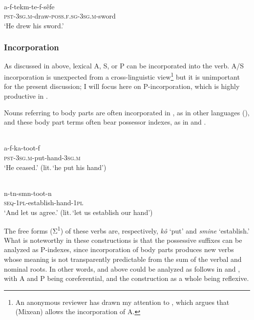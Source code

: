 \documentclass[output=paper]{LSP/langsci}
\begin{document}
\begin{exe}\ex%
\label{05-gr-ex:23}
\\
\gll a-f-tekm-te-f-sêfe\\
\textsc{pst-3sg.m}-draw-\textsc{poss.f.sg-3sg.m}-sword\\
\glt ‘He drew his sword.’ %
\end{exe}

\subsubsection{Incorporation}
\label{05-sec:3-2-3}

As discussed in  above, lexical A, S, or P can be incorporated into the verb. A/S incorporation is unexpected from a cross-linguistic view\footnote{An anonymous reviewer has drawn my attention to \citet{Zavala2000Inversion}, which argues that  (Mixean) allows the incorporation of A.} but it is unimportant for the present discussion; I will focus here on P-incorporation, which is highly productive in . 

 Nouns referring to body parts are often incorporated in , as in other languages (\citealt{Mithun1984Evolution,Mithun1986Nature,Mithunetal1999Effect}), and these body part terms often bear possessor indexes, as in  and .

\begin{exe}
\ex%
\label{05-gr-ex:24}
\\
\gll a-f-ka-toot-f\\
\textsc{pst-3sg.m}-put-hand-\textsc{3sg.m}\\
\glt ‘He ceased.' (lit.\,‘he put his hand’) 
\end{exe}

\begin{exe}
\ex%
\label{05-gr-ex:25}
\\
\gll n-tn-smn-toot-n\\
\textsc{seq-1pl}-establish-hand-\textsc{1pl}\\
\glt ‘And let us agree.’ (lit.\,‘let us establish our hand’) %
\end{exe}

The free forms (Σ\textsuperscript{1}) of these verbs are, respectively, \textit{kô} ‘put’ and \textit{smine} ‘establish.’ What is noteworthy in these constructions is that the possessive suffixes can be analyzed as P-indexes, since incorporation of body parts produces new verbs whose meaning is not transparently predictable from the sum of the verbal and nominal roots. In other words,  and  above could be analyzed as follows in  and , with A and P being coreferential, and the construction as a whole being reflexive.
\end{document}
